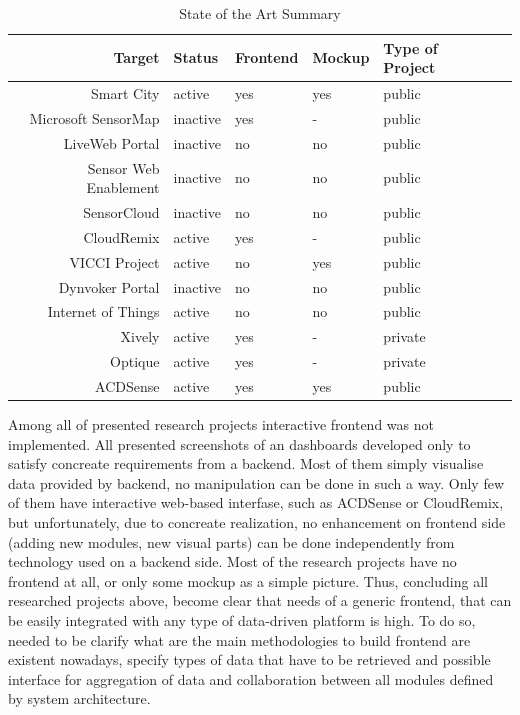     \begin{table}[H]
	\centering
	\begin{tabular}{|r|l|l|l|l|l|}
	\hline
	Target 			       & Status & Frontend & Mockup & Type of Project \\
	\hline 
	Smart City		       & active & yes & yes & public \\
	\hline
	Microsoft SensorMap   & inactive & yes & - & public \\
	\hline
	LiveWeb Portal	       & inactive & no & no & public \\
	\hline
	Sensor Web Enablement  & inactive & no & no & public \\
	\hline
	SensorCloud		       & inactive & no & no & public \\
	\hline
	CloudRemix		       & active & yes & - & public \\
	\hline
	VICCI Project		   & active & no & yes & public \\
	\hline
	Dynvoker Portal		   & inactive & no & no & public \\
	\hline
	Internet of Things	   & active & no & no & public \\
	\hline
	Xively                 & active & yes & - & private \\
	\hline
	Optique                & active & yes & - & private \\
	\hline
	ACDSense               & active & yes & yes & public \\
	\hline
	\end{tabular}
	\caption[State of the Art]{State of the Art Summary}
	\label{tab:state_of_the_art}
	\end{table}

Among all of presented research projects interactive frontend was not implemented. All presented screenshots of an dashboards developed only to satisfy concreate requirements from a backend. Most of them simply visualise data provided by backend, no manipulation can be done in such a way. Only few of them have interactive web-based interfase, such as ACDSense or CloudRemix, but unfortunately, due to concreate realization, no enhancement on frontend side (adding new modules, new visual parts) can be done independently from technology used on a backend side. Most of the research projects have no frontend at all, or only some mockup as a simple picture. Thus, concluding all researched projects above, become clear that needs of a generic frontend, that can be easily integrated with any type of data-driven platform is high. To do so, needed to be clarify what are the main methodologies to build frontend are existent nowadays, specify types of data that have to be retrieved and possible interface for aggregation of data and collaboration between all modules defined by system architecture.

